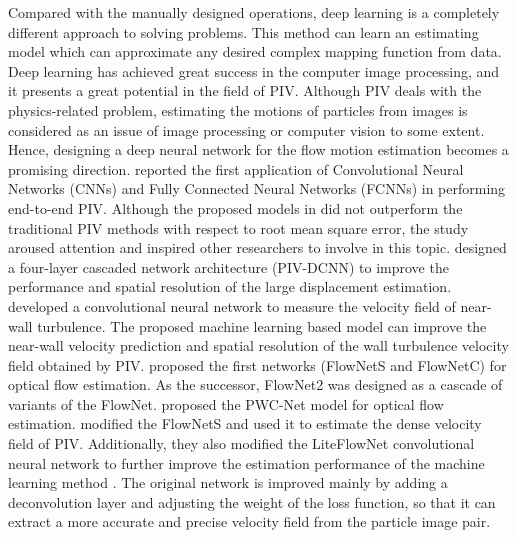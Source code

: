 \documentclass[%
 aip,
 amsmath,amssymb,
 reprint,%
]{revtex4-1}
\begin{document}
Compared with the manually designed operations, deep learning is a completely different approach to solving problems. 
This method can learn an estimating model which can approximate any desired complex mapping function from data. 
Deep learning has achieved great success in the computer image processing, and it presents a great potential in the field of PIV.
Although PIV deals with the physics-related problem, estimating the motions of particles from images is considered as an issue of image processing or computer vision to some extent.
Hence, designing a deep neural network for the flow motion estimation becomes a promising direction.
\citet{rabault2017} reported the first application of Convolutional Neural Networks (CNNs) and Fully Connected Neural Networks (FCNNs) in performing end-to-end PIV. 
Although the proposed models in \citet{rabault2017} did not outperform the traditional PIV methods with respect to root mean square error, the study aroused attention and inspired other researchers to involve in this topic. 
\citet{lee2017} designed a four-layer cascaded network architecture (PIV-DCNN) to improve the performance and spatial resolution of the large displacement estimation. 
\citet{wang2020} developed a convolutional neural network to measure the velocity field of near-wall turbulence. 
The proposed machine learning based model can improve the near-wall velocity prediction and spatial resolution of the wall turbulence velocity field obtained by PIV.
\citet{dosovitskiy2015} proposed the first networks (FlowNetS and FlowNetC) for optical flow estimation. As the successor, FlowNet2 \citep{Ilg2017} was designed as a cascade of variants of the FlowNet.
\citet{Sun2017} proposed the PWC-Net model for optical flow estimation.
\citet{cai2019} modified the FlowNetS and used it to estimate the dense velocity field of PIV.
Additionally, they also modified the LiteFlowNet \citep{hui2018} convolutional neural network to further improve the estimation performance of the machine learning method \citep{cai2019particle}. 
The original network is improved mainly by adding a deconvolution layer and adjusting the weight of the loss function, so that it can extract a more accurate and precise velocity field from the particle image pair.

\end{document}
